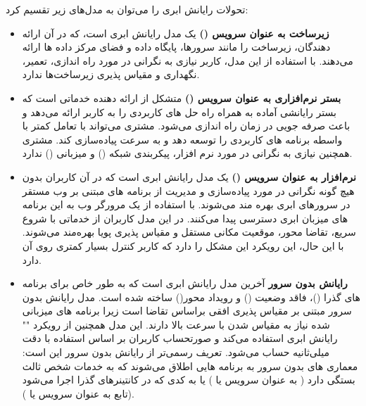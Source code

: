 تحولات رایانش ابری را می‌توان به مدل‌های زیر تقسیم کرد:

\begin{itemize}
	
	\item \textbf{زیرساخت به عنوان سرویس ()} یک مدل رایانش ابری است، که در آن ارائه دهندگان، زیرساخت را مانند سرورها، پایگاه داده و فضای مرکز داده ها ارائه می‌دهند. با استفاده از این مدل، کاربر نیازی به نگرانی در مورد راه اندازی، تعمیر، نگهداری و مقیاس پذیری زیرساخت‌ها ندارد.
	
	\item \textbf{بستر نرم‌افزاری به عنوان سرویس ()} متشکل از ارائه دهنده خدماتی است که بستر رایانشی آماده به همراه راه حل های کاربردی را به کاربر ارائه می‌دهد و باعث صرفه جویی در زمان راه اندازی می‌شود. مشتری می‌تواند با تعامل کمتر با واسطه برنامه های کاربردی را توسعه دهد و به سرعت پیاده‌سازی کند. مشتری همچنین نیازی به نگرانی در مورد نرم افزار، پیکربندی شبکه () و میزبانی () ندارد.
	
	\item \textbf{نرم‌افزار به عنوان سرویس ()} یک مدل رایانش ابری است که در آن کاربران بدون هیچ گونه نگرانی در مورد پیاده‌سازی و مدیریت از برنامه های مبتنی بر وب مستقر در سرورهای ابری بهره مند می‌شوند. با استفاده از یک مرورگر وب به این برنامه های میزبان ابری دسترسی پیدا می‌کنند. در این مدل کاربران از خدماتی با شروع سریع، تقاضا محور، موقعیت مکانی مستقل و مقیاس پذیری پویا بهره‌مند می‌شوند. با این حال، این رویکرد این مشکل را دارد که کاربر کنترل بسیار کمتری روی آن دارد.
	
	\item \textbf{رایانش بدون سرور} آخرین مدل رایانش ابری است که به طور خاص برای برنامه های گذرا ()، فاقد وضعیت () و رویداد محور() ساخته شده است. مدل رایانش بدون سرور مبتنی بر مقیاس پذیری افقی براساس تقاضا است زیرا برنامه های میزبانی شده نیاز به مقیاس شدن با سرعت بالا دارند. این مدل همچنین از رویکرد "" رایانش ابری استفاده می‌کند و صورتحساب کاربران بر اساس استفاده با دقت میلی‌ثانیه حساب می‌شود. تعریف رسمی‌تر از رایانش بدون سرور این است: معماری های بدون سرور به برنامه هایی اطلاق می‌شوند که به خدمات شخص ثالث بستگی دارد ( به عنوان سرویس یا ) یا به کدی که در کانتینرهای گذرا اجرا می‌شود (تابع به عنوان سرویس یا ).
	
\end{itemize}

